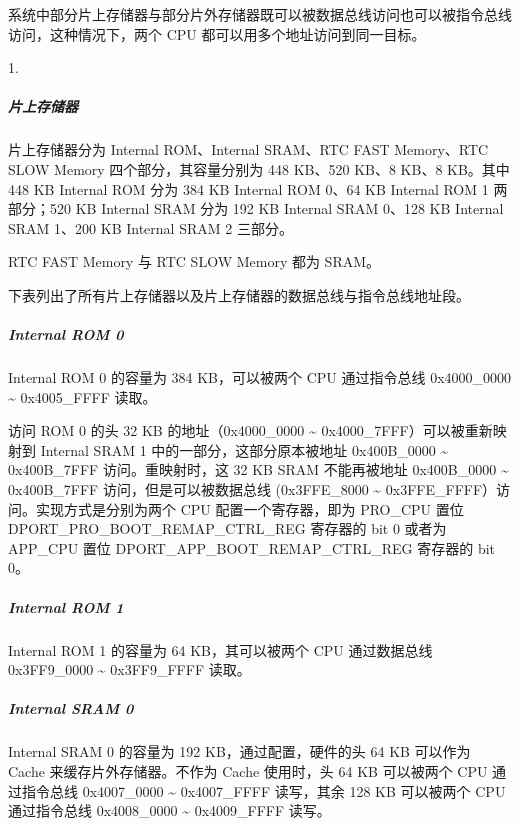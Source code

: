 \documentclass[a4paper,12pt,english]{sphinxmanual}
\begin{document}
\sphinxAtStartPar
系统中部分片上存储器与部分片外存储器既可以被数据总线访问也可以被指令总线访问，这种情况下，两个 CPU 都可以用多个地址访问到同一目标。

\sphinxAtStartPar
{} 1­. 

\sphinxAtStartPar
{}


\subparagraph{片上存储器}
\label{\detokenize{dev-board/esp32:id11}}
\sphinxAtStartPar
片上存储器分为 Internal ROM、Internal SRAM、RTC FAST Memory、RTC SLOW Memory 四个部分，其容量分别为 448 KB、520 KB、8 KB、8 KB。其中 448 KB Internal ROM 分为 384 KB Internal ROM 0、64 KB Internal ROM 1 两部分；520 KB Internal SRAM 分为 192 KB Internal SRAM 0、128 KB Internal SRAM 1、200 KB Internal SRAM 2 三部分。

\sphinxAtStartPar
RTC FAST Memory 与 RTC SLOW Memory 都为 SRAM。

\sphinxAtStartPar
下表列出了所有片上存储器以及片上存储器的数据总线与指令总线地址段。

\sphinxAtStartPar
{}


\subparagraph{Internal ROM 0}
\label{\detokenize{dev-board/esp32:internal-rom-0}}
\sphinxAtStartPar
Internal ROM 0 的容量为 384 KB，可以被两个 CPU 通过指令总线 0x4000\_0000 \textasciitilde{} 0x4005\_FFFF 读取。

\sphinxAtStartPar
访问 ROM 0 的头 32 KB 的地址（0x4000\_0000 \textasciitilde{} 0x4000\_7FFF）可以被重新映射到 Internal SRAM 1 中的一部分，这部分原本被地址 0x400B\_0000 \textasciitilde{} 0x400B\_7FFF 访问。重映射时，这 32 KB SRAM 不能再被地址 0x400B\_0000 \textasciitilde{} 0x400B\_7FFF 访问，但是可以被数据总线 (0x3FFE\_8000 \textasciitilde{} 0x3FFE\_FFFF）访问。实现方式是分别为两个 CPU 配置一个寄存器，即为 PRO\_CPU 置位 DPORT\_PRO\_BOOT\_REMAP\_CTRL\_REG 寄存器的 bit 0 或者为 APP\_CPU 置位 DPORT\_APP\_BOOT\_REMAP\_CTRL\_REG 寄存器的 bit 0。


\subparagraph{Internal ROM 1}
\label{\detokenize{dev-board/esp32:internal-rom-1}}
\sphinxAtStartPar
Internal ROM 1 的容量为 64 KB，其可以被两个 CPU 通过数据总线 0x3FF9\_0000 \textasciitilde{} 0x3FF9\_FFFF 读取。


\subparagraph{Internal SRAM 0}
\label{\detokenize{dev-board/esp32:internal-sram-0}}
\sphinxAtStartPar
Internal SRAM 0 的容量为 192 KB，通过配置，硬件的头 64 KB 可以作为 Cache 来缓存片外存储器。不作为 Cache 使用时，头 64 KB 可以被两个 CPU 通过指令总线 0x4007\_0000 \textasciitilde{} 0x4007\_FFFF 读写，其余 128 KB 可以被两个 CPU 通过指令总线 0x4008\_0000 \textasciitilde{} 0x4009\_FFFF 读写。
\end{document}
